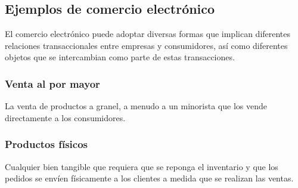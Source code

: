 \documentclass[12pt,letterpaper]{article}
\begin{document}
\subsection{Ejemplos de comercio electrónico}
El comercio electrónico puede adoptar diversas formas que implican diferentes relaciones 
transaccionales entre empresas y consumidores, así como diferentes objetos que se intercambian como parte de estas transacciones.


\subsubsection{Venta al por mayor}
La venta de productos a granel, a menudo a un minorista que los vende directamente a los 
consumidores.




\subsubsection{Productos físicos}
Cualquier bien tangible que requiera que se reponga el inventario y que los pedidos se 
envíen físicamente a los clientes a medida que se realizan las ventas.

\end{document}
